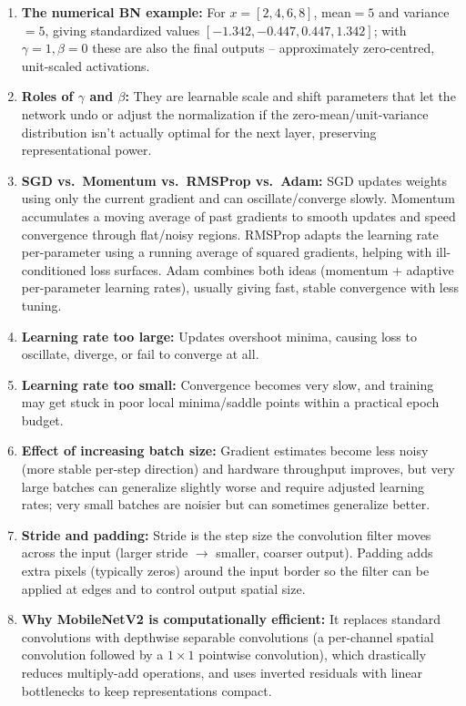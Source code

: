 \documentclass[10pt]{article}
\begin{document}
\begin{enumerate}
\item \textbf{The numerical BN example:} For $x=[2,4,6,8]$, mean$=5$ and
variance$=5$, giving standardized values $[-1.342,-0.447,0.447,1.342]$;
with $\gamma=1,\beta=0$ these are also the final outputs --
approximately zero-centred, unit-scaled activations.

\item \textbf{Roles of $\gamma$ and $\beta$:} They are learnable scale
and shift parameters that let the network undo or adjust the
normalization if the zero-mean/unit-variance distribution isn't actually
optimal for the next layer, preserving representational power.

\item \textbf{SGD vs.\ Momentum vs.\ RMSProp vs.\ Adam:} SGD updates
weights using only the current gradient and can oscillate/converge
slowly. Momentum accumulates a moving average of past gradients to smooth
updates and speed convergence through flat/noisy regions. RMSProp adapts
the learning rate per-parameter using a running average of squared
gradients, helping with ill-conditioned loss surfaces. Adam combines both
ideas (momentum + adaptive per-parameter learning rates), usually giving
fast, stable convergence with less tuning.

\item \textbf{Learning rate too large:} Updates overshoot minima, causing
loss to oscillate, diverge, or fail to converge at all.

\item \textbf{Learning rate too small:} Convergence becomes very slow,
and training may get stuck in poor local minima/saddle points within a
practical epoch budget.

\item \textbf{Effect of increasing batch size:} Gradient estimates become
less noisy (more stable per-step direction) and hardware throughput
improves, but very large batches can generalize slightly worse and
require adjusted learning rates; very small batches are noisier but can
sometimes generalize better.

\item \textbf{Stride and padding:} Stride is the step size the
convolution filter moves across the input (larger stride $\rightarrow$
smaller, coarser output). Padding adds extra pixels (typically zeros)
around the input border so the filter can be applied at edges and to
control output spatial size.

\item \textbf{Why MobileNetV2 is computationally efficient:} It replaces
standard convolutions with depthwise separable convolutions (a
per-channel spatial convolution followed by a $1\times1$ pointwise
convolution), which drastically reduces multiply-add operations, and uses
inverted residuals with linear bottlenecks to keep representations
compact.


\end{enumerate}
\end{document}
